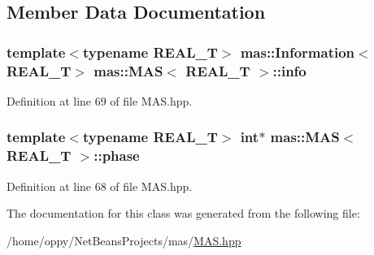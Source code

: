 \subsection{Member Data Documentation}
\hypertarget{classmas_1_1_m_a_s_adf64a1ceccb1e52a43bc9ebebd87fd45}{
\subsubsection[{info}]{\setlength{\rightskip}{0pt plus 5cm}template$<$typename R\-E\-A\-L\-\_\-\-T$>$ {\bf mas\-::\-Information}$<$ R\-E\-A\-L\-\_\-\-T$>$ {\bf mas\-::\-M\-A\-S}$<$ R\-E\-A\-L\-\_\-\-T $>$\-::info}}\label{classmas_1_1_m_a_s_adf64a1ceccb1e52a43bc9ebebd87fd45}


Definition at line 69 of file M\-A\-S.\-hpp.

\hypertarget{classmas_1_1_m_a_s_a26d078a9930af45b319da8e6fdc5ae7d}{
\subsubsection[{phase}]{\setlength{\rightskip}{0pt plus 5cm}template$<$typename R\-E\-A\-L\-\_\-\-T$>$ int$\ast$ {\bf mas\-::\-M\-A\-S}$<$ R\-E\-A\-L\-\_\-\-T $>$\-::phase}}\label{classmas_1_1_m_a_s_a26d078a9930af45b319da8e6fdc5ae7d}


Definition at line 68 of file M\-A\-S.\-hpp.



The documentation for this class was generated from the following file\-:\begin{DoxyCompactItemize}
\item 
/home/oppy/\-Net\-Beans\-Projects/mas/\hyperlink{_m_a_s_8hpp}{M\-A\-S.\-hpp}\end{DoxyCompactItemize}
